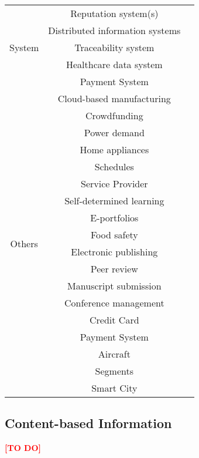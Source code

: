 \begin{longtable}{ |c|c|p{4cm}| }
	 \multirow{5}{*}{System} & Reputation system(s) & \cite{2015_Dennis,2016_Schaub} \\ \cline{2-3}
	 & Distributed information systems & \cite{2016_Azaria} \\ \cline{2-3}
	 & Traceability system & \cite{2016_Tian} \\ \cline{2-3}
	 & Healthcare data system & \cite{2016_Yue} \\ \cline{2-3}
	 & Payment System & \cite{2017_Jaag} \\
	 \hline
	 \multirow{18}{*}{Others} & Cloud-based manufacturing & \cite{2016_Bahga} \\ \cline{2-3}
	 & Crowdfunding & \cite{2016_Jacynycz} \\ \cline{2-3}
	 & Power demand & \multirow{3}{*}{\cite{2016_Kianmajd}} \\ \cline{2-2}
	 & Home appliances &  \\ \cline{2-2}
	 & Schedules &  \\ \cline{2-3}
	 & Service Provider & \cite{2016_Schaub} \\ \cline{2-3}
	 & Self-determined learning & \multirow{2}{*}{\cite{2016_Sharples}} \\ \cline{2-2}
	 & E-portfolios & \\ \cline{2-3}
	 & Food safety & \cite{2016_Tian} \\ \cline{2-3}
	 & Electronic publishing & \multirow{4}{*}{\cite{2017_Gipp}} \\ \cline{2-2}
	 & Peer review & \\ \cline{2-2}
	 & Manuscript   submission & \\ \cline{2-2}
	 & Conference management & \\ \cline{2-3}
	 & Credit Card & \multirow{2}{*}{\cite{2017_Jaag}} \\ \cline{2-2}
	 & Payment System & \\ \cline{2-3}
	 & Aircraft & \multirow{2}{*}{\cite{2017_Madhwal}} \\ \cline{2-2}
	 & Segments &  \\ \cline{2-3}
	 & Smart City & \cite{2018_Alessandra} \\
	 \hline
\end{longtable}




\clearpage
\subsection{Content-based Information}
\label{subsec:ContentBasedInformation}
\textcolor{red}{\textbf{[TO DO]}}
